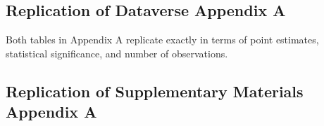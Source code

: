 \documentclass[
  12pt,
]{article}
\begin{document}
\clearpage

\hypertarget{replication-of-dataverse-appendix-a}{%
\subsection{Replication of Dataverse Appendix A}\label{replication-of-dataverse-appendix-a}}

Both tables in Appendix A replicate exactly in terms of point estimates, statistical significance, and number of observations.





\clearpage

\hypertarget{replication-of-supplementary-materials-appendix-a}{%
\subsection{Replication of Supplementary Materials Appendix A}\label{replication-of-supplementary-materials-appendix-a}}
\end{document}
